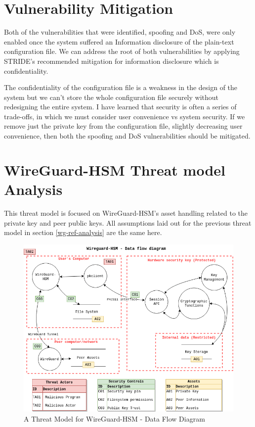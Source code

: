 \documentclass [11pt, proquest] {uwthesis}[2020/02/24]
\begin{document}
\section{Vulnerability Mitigation}
\label{vulns}
Both of the vulnerabilities that were identified, spoofing and DoS, were only enabled once the system suffered an Information disclosure of the plain-text configuration file. We can address the root of both vulnerabilities by applying STRIDE's recommended mitigation for information disclosure which is confidentiality. 

The confidentiality of the configuration file is a weakness in the design of the system but we can't store the whole configuration file securely without redesigning the entire system. I have learned that security is often a series of trade-offs, in which we must consider user convenience vs system security. If we remove just the private key from the configuration file, slightly decreasing user convenience, then both the spoofing and DoS vulnerabilities should be mitigated. 

\section{WireGuard-HSM Threat model Analysis}
\label{wg-hsm-analysis}
This threat model is focused on WireGuard-HSM's asset handling related to the private key and peer public keys. All assumptions laid out for the previous threat model in section \ref{wg-ref-analysis} are the same here.

\begin{figure}[ht]
\includegraphics[width=14cm]{paper/images/WGHSM_DFD.drawio.png}
\caption{A Threat Model for WireGuard-HSM - Data Flow Diagram}
\label{fig:wg_hsm_dfd}
\end{figure}
\end{document}

